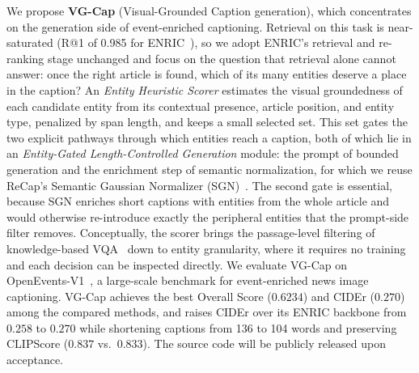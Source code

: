 \documentclass[runningheads]{llncs}
\DeclareRobustCommand{\aciids}[1]{{\color{olive}#1}}
\DeclareRobustCommand{\aciids}[1]{#1}
\begin{document}
\aciids{We propose \textbf{VG-Cap} (Visual-Grounded Caption generation), which concentrates on the generation side of event-enriched captioning. Retrieval on this task is near-saturated (R@1 of 0.985 for ENRIC~\cite{enric}), so we adopt ENRIC's retrieval and re-ranking stage unchanged and focus on the question that retrieval alone cannot answer: once the right article is found, which of its many entities deserve a place in the caption? An \emph{Entity Heuristic Scorer} estimates the visual groundedness of each candidate entity from its contextual presence, article position, and entity type, penalized by span length, and keeps a small selected set. This set gates the two explicit pathways through which entities reach a caption, both of which lie in an \emph{Entity-Gated Length-Controlled Generation} module: the prompt of bounded generation and the enrichment step of semantic normalization, for which we reuse ReCap's Semantic Gaussian Normalizer (SGN)~\cite{recap}. The second gate is essential, because SGN enriches short captions with entities from the whole article and would otherwise re-introduce exactly the peripheral entities that the prompt-side filter removes. Conceptually, the scorer brings the passage-level filtering of knowledge-based VQA~\cite{gui2022kat,yan2024echosight,cocchi2025reflectiva} down to entity granularity, where it requires no training and each decision can be inspected directly.} \aciids{We evaluate VG-Cap on OpenEvents-V1~\cite{nguyen2025openevents}, a large-scale benchmark for event-enriched news image captioning. VG-Cap achieves the best Overall Score ($0.6234$) and CIDEr ($0.270$) among the compared methods, and raises CIDEr over its ENRIC backbone from $0.258$ to $0.270$ while shortening captions from 136 to 104 words and preserving CLIPScore ($0.837$ vs.\ $0.833$). The source code will be publicly released upon acceptance.}
\end{document}
